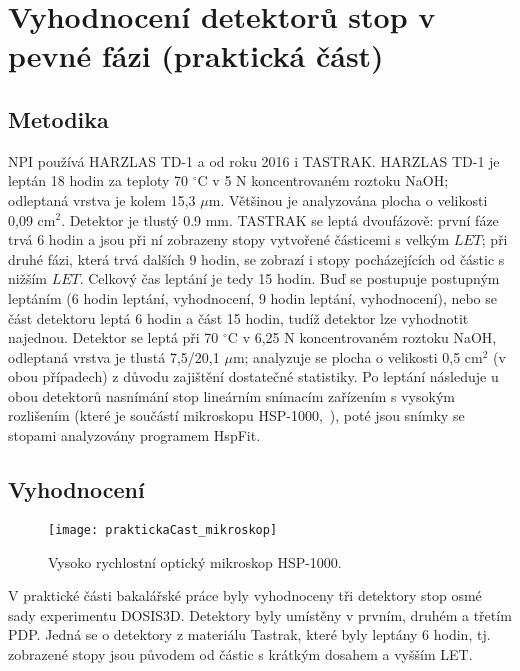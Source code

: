 \chapter{Vyhodnocení detektorů stop v pevné fázi (praktická část)}
\section{Metodika}
NPI používá HARZLAS TD-1 a od roku 2016 i TASTRAK. HARZLAS TD-1 je leptán 18 hodin za teploty 70 $^{\circ}$C v 5 N koncentrovaném roztoku NaOH; odleptaná vrstva je kolem 15,3 $\mu$m. Většinou je analyzována plocha o velikosti 0,09 cm$^2$. Detektor je tlustý 0.9 mm. TASTRAK se leptá dvoufázově: první fáze trvá 6 hodin a jsou při ní zobrazeny stopy vytvořené částicemi s velkým $\mathit{LET}$; při druhé fázi, která trvá dalších 9 hodin, se zobrazí i stopy pocházejících od částic s nižším $\mathit{LET}$. Celkový čas leptání je tedy 15 hodin. Buď se postupuje postupným leptáním (6 hodin leptání, vyhodnocení, 9 hodin leptání, vyhodnocení), nebo se část detektoru leptá 6 hodin a část 15 hodin, tudíž
detektor lze vyhodnotit najednou. Detektor se leptá při 70 $^{\circ}$C v 6,25 N koncentrovaném roztoku NaOH, odleptaná vrstva je tlustá 7,5/20,1 $\mu$m; analyzuje se plocha o velikosti 0,5 cm$^2$ (v obou případech) z důvodu zajištění dostatečné statistiky. Po leptání následuje u obou detektorů nasnímání stop lineárním snímacím zařízením s vysokým rozlišením (které je součástí mikroskopu HSP-1000,~\cite{dosis_HSP1000}), poté jsou snímky se stopami analyzovány programem HspFit.
\section{Vyhodnocení}
\begin{wrapfigure}{r}{0.42\textwidth}
  \centering
  \texttt{[image: praktickaCast\_mikroskop]}
  \caption{Vysoko rychlostní optický mikroskop HSP-1000.~\cite{dosis_HSP1000}}
  \label{fig:praktickaCast_mikroskop}
  \vspace{-10pt}
\end{wrapfigure}
V praktické části bakalářské práce byly vyhodnoceny tři detektory stop osmé sady experimentu DOSIS3D. Detektory byly umístěny v prvním, druhém a třetím PDP. Jedná se o detektory z materiálu Tastrak, které byly leptány 6 hodin, tj. zobrazené stopy jsou původem od částic s krátkým dosahem a vyšším LET.

